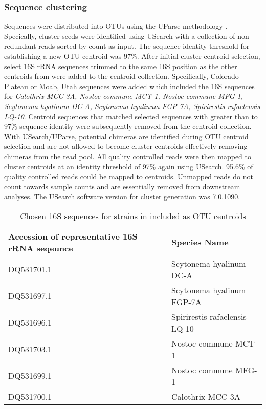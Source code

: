 \subsubsection{Sequence clustering}
Sequences were distributed into OTUs using the UParse methodology \cite{23955772}. Specically, cluster seeds were identified using USearch with a collection of non-redundant reads sorted by count as input. The sequence identity threshold for establishing a new OTU centroid was 97\%. After initial cluster centroid selection, select 16S rRNA sequences trimmed to the same 16S position as the other centroids from \citet{Yeager} were added to the centroid collection. Specifically, \citet{Yeager} Colorado Plateau or Moab, Utah sequences were added which included the 16S sequences for \textit{Calothrix MCC-3A, Nostoc commune MCT-1, Nostoc commune MFG-1, Scytonema hyalinum DC-A, Scytonema hyalinum FGP-7A, Spirirestis rafaelensis LQ-10}. Centroid sequences that matched selected \citet{Yeager} sequences with greater than to 97\% sequence identity were subsequently removed from the centroid collection. With USearch/UParse, potential chimeras are identified during OTU centroid selection and are not allowed to become cluster centroids effectively removing chimeras from the read pool. All quality controlled reads were then mapped to cluster centroids at an identity threshold of 97\% again using USearch. 95.6\% of quality controlled reads could be mapped to centroids. Unmapped reads do not count towards sample counts and are essentially removed from downstream analyses. The USearch software version for cluster generation was 7.0.1090.

\begin{table}
\begin{center}
\begin{tabular}{ l l }
\textbf{Accession of representative 16S rRNA seqeunce} &
\textbf{Species Name} \\ 
\hline
DQ531701.1 & Scytonema hyalinum DC-A \\
DQ531697.1 & Scytonema hyalinum FGP-7A \\
DQ531696.1 & Spirirestis rafaelensis LQ-10 \\
DQ531703.1 & Nostoc commune MCT-1 \\
DQ531699.1 & Nostoc commune MFG-1 \\
DQ531700.1 & Calothrix MCC-3A  \\
\hline
\end{tabular}
\end{center}
\caption{Chosen 16S sequences for strains in \citet{Yeager} included as OTU centroids}
\label{table:yeager_2006}
\end{table}

